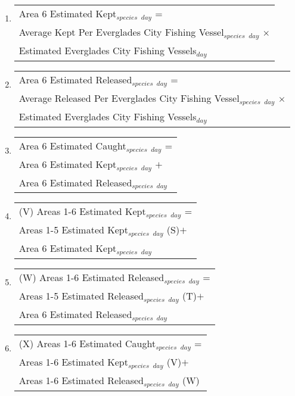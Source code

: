 \documentclass[letterpaper,12pt]{article}
\newcommand{\hspacer}{\hspace*{1cm}}
\begin{document}
\begin{enumerate}
\item
\begin{tabular}{l@{ }}
	Area 6 Estimated Kept$_{species}$ $_{day}$ = \\
	 \hspacer Average Kept Per Everglades City Fishing Vessel$_{species}$ $_{day}$ $\times$ \\
	 \hspacer Estimated Everglades City Fishing Vessels$_{day}$
\end{tabular}

\item
\begin{tabular}{l@{ }}
	Area 6 Estimated Released$_{species}$ $_{day}$ = \\
	 \hspacer Average Released Per Everglades City Fishing Vessel$_{species}$ $_{day}$ $\times$ \\
	 \hspacer Estimated Everglades City Fishing Vessels$_{day}$
\end{tabular}

\item
\begin{tabular}{l@{ }}
	Area 6 Estimated Caught$_{species}$ $_{day}$ = \\
		\hspacer Area 6 Estimated Kept$_{species}$ $_{day}$ $+$ \\
		\hspacer Area 6 Estimated Released$_{species}$ $_{day}$
\end{tabular}

\item
\begin{tabular}{l@{ }}
	(V) Areas 1-6 Estimated Kept$_{species}$ $_{day}$ = \\
		\hspacer Areas 1-5 Estimated Kept$_{species}$ $_{day}$ (S)$+$ \\
		\hspacer Area 6 Estimated Kept$_{species}$ $_{day}$
\end{tabular}

\item
\begin{tabular}{l@{ }}
	(W) Areas 1-6 Estimated Released$_{species}$ $_{day}$ = \\
		\hspacer Areas 1-5 Estimated Released$_{species}$ $_{day}$ (T)$+$ \\
		\hspacer Area 6 Estimated Released$_{species}$ $_{day}$
\end{tabular}

\item
\begin{tabular}{l@{ }}
	(X) Areas 1-6 Estimated Caught$_{species}$ $_{day}$ = \\
		\hspacer Areas 1-6 Estimated Kept$_{species}$ $_{day}$ (V)$+$ \\
		\hspacer Areas 1-6 Estimated Released$_{species}$ $_{day}$ (W)
\end{tabular}

\end{enumerate}


\end{document}
